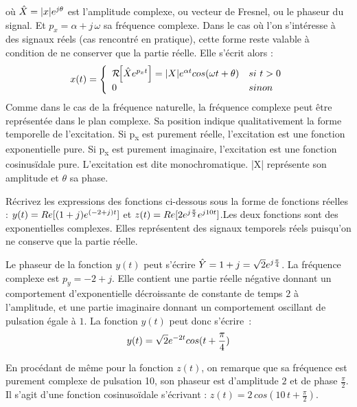 	où $ \hat{X} = |x| e^{j \theta}$ est l'amplitude complexe,
        ou vecteur de Fresnel, ou le phaseur du signal. Et
        $p_{x} = \alpha +j\,\omega $ sa fréquence complexe. Dans le
        cas où l'on s'intéresse à des signaux réels (cas rencontré en
        pratique), cette forme reste valable à condition de ne
        conserver que la partie réelle. Elle s'écrit alors :
	\begin{equation}\label{eq:exc_expo_complexe_reel}
          x(t) =    \left \{
            \begin{array}{l l}
              \mathcal{R}\!\!\left[\hat{X}  e^{p_{x}t}\right] = |X|  e^{\alpha t}  cos(\omega t+\theta)  & si~t>0 \\
              0   & sinon \\
            \end{array}
          \right .
	\end{equation}
	Comme dans le cas de la fréquence naturelle, la fréquence
        complexe peut être représentée dans le plan complexe. Sa position
        indique qualitativement la forme temporelle de
        l'excitation. Si p\textsubscript{x} est purement réelle,
        l'excitation est une fonction exponentielle pure. Si
        p\textsubscript{x} est purement imaginaire, l'excitation est
        une fonction cosinusïdale pure. L'excitation est dite
        monochromatique. |X| représente son amplitude et $\theta$ sa
        phase.
	
        \begin{exemple} Récrivez les expressions des fonctions
          ci-dessous sous la forme de fonctions réelles :
          $y(t)=Re[(1+j)e^{(-2+j)t}]$ et
          $z(t) = Re[2e^{j\frac{\pi}{2}}e^{j10t}]$.Les deux
          fonctions sont des exponentielles complexes. Elles
          représentent des signaux temporels réels puisqu'on ne
          conserve que la partie réelle.

          Le phaseur de la fonction
          $y(t)$ peut s'écrire
          $\hat{Y}=1+j=\sqrt{2}e^{j\frac{\pi}{4}}$. La fréquence
          complexe est $p_y=-2+j$. Elle contient une partie réelle
          négative donnant un comportement d'exponentielle
          décroissante de constante de temps $2$ à l'amplitude, et une
          partie imaginaire donnant un comportement oscillant de
          pulsation égale à $1$. La fonction $y(t)$ peut donc s'écrire~:
          \[y(t)={\sqrt{2}}e^{-2t}cos(t+\frac{\pi}{4})\]

          En procédant de même pour la fonction $z(t)$, on remarque
          que sa fréquence est purement complexe de pulsation 10, son
          phaseur est d'amplitude $2$ et de phase $\frac{\pi}{2}$. Il
          s'agit d'une fonction cosinusoïdale s'écrivant :
          $z(t)=2\,cos(10\,t+\frac{\pi}{2})$.
      \end{exemple}
	
